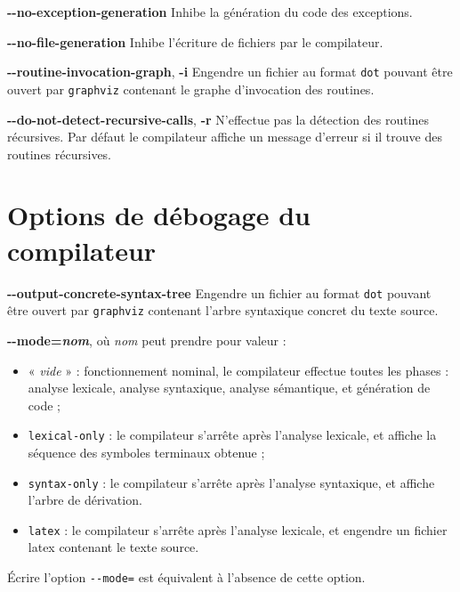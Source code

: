 
\textbf{-{}-no-exception-generation} Inhibe la génération du code des exceptions.



\textbf{-{}-no-file-generation} Inhibe l'écriture de fichiers par le compilateur.


\textbf{-{}-routine-invocation-graph}, \textbf{-i} Engendre un fichier au format \texttt{dot} pouvant être ouvert par \texttt{graphviz} contenant le graphe d'invocation des routines.

\textbf{-{}-do-not-detect-recursive-calls}, \textbf{-r} N'effectue pas la détection des routines récursives. Par défaut le compilateur affiche un message d'erreur si il trouve des routines récursives.







\section{Options de débogage du compilateur}


\textbf{-{}-output-concrete-syntax-tree} Engendre un fichier au format \texttt{dot} pouvant être ouvert par \texttt{graphviz} contenant l'arbre syntaxique concret du texte source.


\textbf{-{}-mode=\emph{nom}}, où \emph{nom} peut prendre pour valeur :
\begin{itemize}
  \item « \emph{vide} » : fonctionnement nominal, le compilateur effectue toutes les phases : analyse lexicale, analyse syntaxique, analyse sémantique, et génération de code ;
  \item \texttt{lexical-only} : le compilateur s'arrête après l'analyse lexicale, et affiche la séquence des symboles terminaux obtenue ;
  \item \texttt{syntax-only} : le compilateur s'arrête après l'analyse syntaxique, et affiche l'arbre de dérivation.
  \item \texttt{latex} : le compilateur s'arrête après l'analyse lexicale, et engendre un fichier latex contenant le texte source.
\end{itemize}

Écrire l'option \texttt{-{}-mode=} est équivalent à l'absence de cette option.
